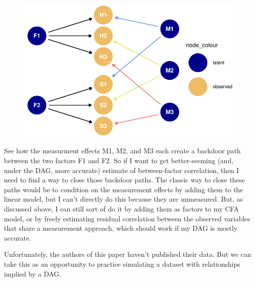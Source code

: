\documentclass[
  letterpaper,
  DIV=11,
  numbers=noendperiod]{scrreprt}
\begin{document}
\begin{figure}[H]

{\centering \includegraphics{./mtmm-and-error-structure-modelling_files/figure-pdf/unnamed-chunk-2-1.pdf}

}

\end{figure}

See how the measurment effects M1, M2, and M3 each create a backdoor
path between the two factors F1 and F2. So if I want to get
better-seeming (and, under the DAG, more accurate) estimate of
between-factor correlation, then I need to find a way to close those
backdoor paths. The classic way to close these paths would be to
condition on the measurement effects by adding them to the linear model,
but I can't directly do this because they are unmeasured. But, as
discussed above, I can still sort of do it by adding them as factors to
my CFA model, or by freely estimating residual correlation between the
observed variables that share a measurement approach, which should work
if my DAG is mostly accurate.

Unfortunately, the authors of this paper haven't published their data.
But we can take this as an opportunity to practice simulating a dataset
with relationships implied by a DAG.
\end{document}
